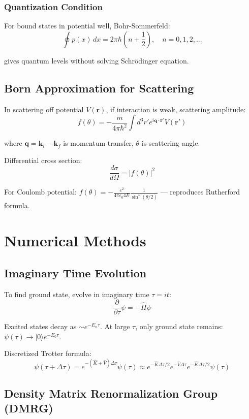 \documentclass[12pt,openany,oneside]{book}
\newcommand{\ket}[1]{|#1\rangle}
\begin{document}
{{{\subsection{Quantization Condition}

For bound states in potential well, Bohr-Sommerfeld:
\[
\oint p(x) \, dx = 2\pi\hbar(n + \frac{1}{2}), \quad n = 0,1,2,...
\]

gives quantum levels without solving Schrödinger equation.

\section{Born Approximation for Scattering}

In scattering off potential $V(\mathbf{r})$, if interaction is weak, scattering amplitude:
\[
f(\theta) = -\frac{m}{4\pi\hbar^2}\int d^3r' e^{i\mathbf{q} \cdot \mathbf{r}'}V(\mathbf{r}')
\]

where $\mathbf{q} = \mathbf{k}_i - \mathbf{k}_f$ is momentum transfer, $\theta$ is scattering angle.

Differential cross section:
\[
\frac{d\sigma}{d\Omega} = |f(\theta)|^2
\]

For Coulomb potential: $f(\theta) = -\frac{e^2}{4\pi\epsilon_0 4E}\frac{1}{\sin^4(\theta/2)}$ — reproduces Rutherford formula.

\chapter{Numerical Methods}

\section{Imaginary Time Evolution}

To find ground state, evolve in imaginary time $\tau = it$:
\[
\frac{\partial}{\partial\tau}\psi = -\hat{H}\psi
\]

Excited states decay as $\sim e^{-E_n\tau}$. At large $\tau$, only ground state remains: $\psi(\tau) \to \ket{0}e^{-E_0\tau}$.

Discretized Trotter formula:
\[
\psi(\tau + \Delta\tau) = e^{-(\hat{K} + \hat{V})\Delta\tau}\psi(\tau) \approx e^{-\hat{K}\Delta\tau/2}e^{-\hat{V}\Delta\tau}e^{-\hat{K}\Delta\tau/2}\psi(\tau)
\]

\section{Density Matrix Renormalization Group (DMRG)}

}}}
\end{document}
